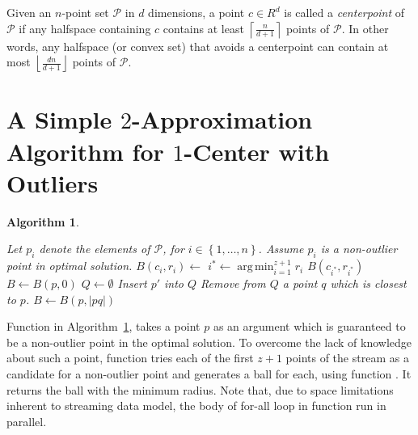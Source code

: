 \documentclass[envcountsame]{cls/cccg15}
\newtheorem{algorithm}{Algorithm}
\DeclareMathOperator*{\argmin}{arg\,min}
\newcommand{\set}[1]{\left\{ #1 \right\}}
\newcommand{\ceil}[1]{\left\lceil{#1}\right\rceil}
\newcommand{\floor}[1]{\left\lfloor{#1}\right\rfloor}
\newcommand{\card}[1]{\left|{#1}\right|}
\begin{document}

Given an $n$-point set $\mathcal{P}$ in $d$ dimensions, a point $c \in R^d$ is called a \emph{centerpoint} of $\mathcal{P}$ if any halfspace containing $c$ contains at least $\ceil{\frac{n}{d + 1}}$ points of $\mathcal{P}$. In other words, any halfspace (or convex set) that avoids a centerpoint can contain at most $\floor{\frac{dn}{d + 1}}$ points of $\mathcal{P}$.



\section{A Simple $2$-Approximation Algorithm for $1$-Center with Outliers}

\begin{algorithm}
\label{alg:1center}
\leavevmode
\begin{algorithmic}
	\State Let $p_i$ denote the elements of $\mathcal{P}$, for $i \in \set{1, \dots, n}$.
		\State Assume $p_i$ is a non-outlier point in optimal solution.
		\State $B(c_i, r_i) \gets$ 
	\EndFor
	\State $i^* \gets \argmin_{i=1}^{z+1} r_i$
	\State \Return $B(c_{i^*}, r_{i^*})$
\EndFunction
\Statex
{}
	\State $B \gets B(p, 0)$
	\State $Q \gets \emptyset$
			\State Insert $p'$ into $Q$
			\If{$\card{Q} = z + 1$}
				\State Remove from $Q$ a point $q$ which is closest to $p$.
				\State $B \gets B(p, \card{pq})$
			\EndIf
		\EndIf
	\EndFor
	\State {}
\EndFunction
\end{algorithmic}
\end{algorithm}
Function  in Algorithm~\ref{alg:1center}, takes a point $p$ as an argument which is guaranteed to be a non-outlier point in the optimal solution. To overcome the lack of knowledge about such a point, function  tries each of the first $z+1$ points of the stream as a candidate for a non-outlier point and generates a ball for each, using function . It returns the ball with the minimum radius. Note that, due to space limitations inherent to streaming data model, the body of for-all loop in function  run in parallel.
\end{document}

